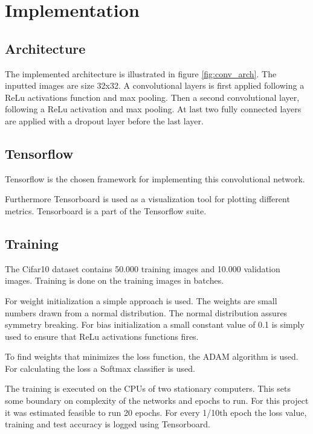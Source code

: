 \chapter{Implementation}
\label{chp:imp}

\section{Architecture}
The implemented architecture is illustrated in figure \ref{fig:conv_arch}. The inputted images are size 32x32. A convolutional layers is first applied following a ReLu activations function and max pooling. Then a second convolutional layer, following a ReLu activation and max pooling. At last two fully connected layers are applied with a dropout layer before the last layer.


\section{Tensorflow}
Tensorflow is the chosen framework for implementing this convolutional network. 

Furthermore Tensorboard is used as a visualization tool for plotting different metrics. Tensorboard is a part of the Tensorflow suite. 

\section{Training}
The Cifar10 dataset contains 50.000 training images and 10.000 validation images. Training is done on the training images in batches. 

For weight initialization a simple approach is used. The weights are small numbers drawn from a normal distribution. The normal distribution assures symmetry breaking. For bias initialization a small constant value of 0.1 is simply used to ensure that ReLu activations functions fires.

To find weights that minimizes the loss function, the ADAM algorithm is used. For calculating the loss a Softmax classifier is used.

The training is executed on the CPUs of two stationary computers. This sets some boundary on complexity of the networks and epochs to run. For this project it was estimated feasible to run 20 epochs. For every 1/10th epoch the loss value, training and test accuracy is logged using Tensorboard.

